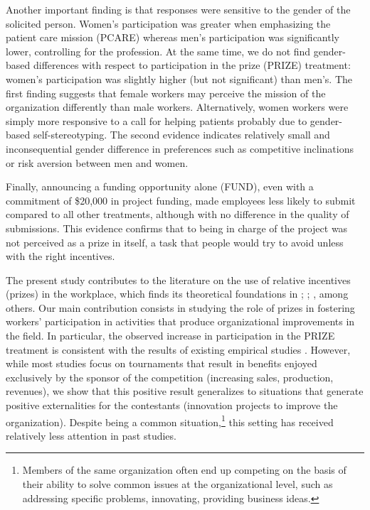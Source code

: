 \documentclass[11pt, titlepage]{article}
\begin{document}
Another important finding is that responses were sensitive to the gender
of the solicited person. Women's participation was greater when
emphasizing the patient care mission (PCARE) whereas men's participation
was significantly lower, controlling for the profession. At the same
time, we do not find gender-based differences with respect to
participation in the prize (PRIZE) treatment: women's participation was
slightly higher (but not significant) than men's. The first finding
suggests that female workers may perceive the mission of the
organization differently than male workers. Alternatively, women workers
were simply more responsive to a call for helping patients probably due
to gender-based self-stereotyping. The second evidence indicates
relatively small and inconsequential gender difference in preferences
such as competitive inclinations or risk aversion between men and women.

Finally, announcing a funding opportunity alone (FUND), even with a
commitment of \$20,000 in project funding, made employees less likely to
submit compared to all other treatments, although with no difference in
the quality of submissions. This evidence confirms that to being in
charge of the project was not perceived as a prize in itself, a task
that people would try to avoid unless with the right incentives.

The present study contributes to the literature on the use of relative
incentives (prizes) in the workplace, which finds its theoretical
foundations in \citet{lazear1981rank}; \citet{green1983comparison};
\citet{mary1984economic}, among others. Our main contribution consists
in studying the role of prizes in fostering workers' participation in
activities that produce organizational improvements in the field. In
particular, the observed increase in participation in the PRIZE
treatment is consistent with the results of existing empirical studies
\citep{bull1987tournaments, knoeber1994testing, eriksson1999executive, ehrenberg1990tournaments, terwiesch2008innovation, terwiesch2009innovation, boudreau2011incentives, boudreau2016performance}.
However, while most studies focus on tournaments that result in benefits
enjoyed exclusively by the sponsor of the competition (increasing sales,
production, revenues), we show that this positive result generalizes to
situations that generate positive externalities for the contestants
(innovation projects to improve the organization). Despite being a
common situation,\footnote{Members of the same organization often end up
  competing on the basis of their ability to solve common issues at the
  organizational level, such as addressing specific problems,
  innovating, providing business ideas.} this setting has received
relatively less attention in past studies.
\end{document}
